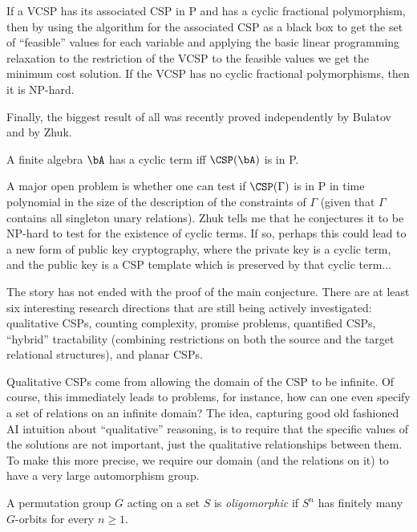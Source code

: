 \begin{thm} If a VCSP has its associated CSP in P and has a cyclic fractional polymorphism, then by using the algorithm for the associated CSP as a black box to get the set of ``feasible'' values for each variable and applying the basic linear programming relaxation to the restriction of the VCSP to the feasible values we get the minimum cost solution. If the VCSP has no cyclic fractional polymorphisms, then it is NP-hard.
\end{thm}

Finally, the biggest result of all was recently proved independently by Bulatov and by Zhuk.

\begin{thm} A finite algebra $\bA$ has a cyclic term iff $\CSP(\bA)$ is in P.
\end{thm}

A major open problem is whether one can test if $\CSP(\Gamma)$ is in P in time polynomial in the size of the description of the constraints of $\Gamma$ (given that $\Gamma$ contains all singleton unary relations). Zhuk tells me that he conjectures it to be NP-hard to test for the existence of cyclic terms. If so, perhaps this could lead to a new form of public key cryptography, where the private key is a cyclic term, and the public key is a CSP template which is preserved by that cyclic term...

The story has not ended with the proof of the main conjecture. There are at least six interesting research directions that are still being actively investigated: qualitative CSPs, counting complexity, promise problems, quantified CSPs, ``hybrid'' tractability (combining restrictions on both the source and the target relational structures), and planar CSPs.

Qualitative CSPs come from allowing the domain of the CSP to be infinite. Of course, this immediately leads to problems, for instance, how can one even specify a set of relations on an infinite domain? The idea, capturing good old fashioned AI intuition about ``qualitative'' reasoning, is to require that the specific values of the solutions are not important, just the qualitative relationships between them. To make this more precise, we require our domain (and the relations on it) to have a very large automorphism group.

\begin{defn} A permutation group $G$ acting on a set $S$ is \emph{oligomorphic} if $S^n$ has finitely many $G$-orbits for every $n \ge 1$.
\end{defn}

